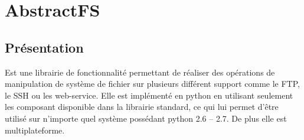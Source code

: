 \part{AbstractFS}

\chapter{Présentation}
	Est une librairie de fonctionnalité  permettant de réaliser des opérations de manipulation de système de fichier sur plusieurs différent support comme le FTP, le SSH ou les web-service.
	Elle est implémenté en python en utilisant seulement les composant disponible dans la librairie standard, ce qui lui permet d'être utilisé sur n'importe quel système possédant python 2.6 – 2.7.
	De plus elle est multiplateforme.
